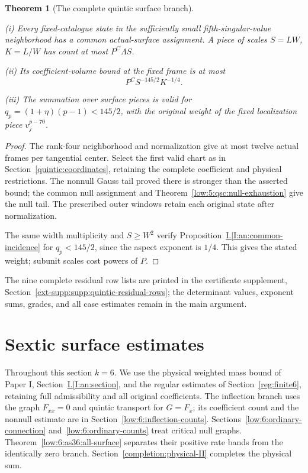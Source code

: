 \documentclass[11pt]{amsart}
\newtheorem{theorem}{Theorem}[section]
\theoremstyle{definition}
\theoremstyle{remark}
\numberwithin{equation}{section}
\newcommand{\partIref}[1]{\hyperref[I:#1]{I.\ref*{I:#1}}}
\begin{document}
\begin{theorem}[The complete quintic surface branch]\label{low:5:qsc:surface-count}

\noindent\textup{(i)} Every fixed-catalogue state in the sufficiently small fifth-singular-value neighborhood has a common actual-surface assignment. A piece of scales $S=LW$, $K=L/W$ has count at most $P^C\Lambda S$.

\noindent\textup{(ii)} Its coefficient-volume bound at the fixed frame is at most
\[
P^CS^{-145/2}K^{-1/4}.
\]

\noindent\textup{(iii)} The summation over surface pieces is valid for $q_p=(1+\eta)(p-1)<145/2$, with the original weight of the fixed localization piece $v_j^{p-70}$.
\end{theorem}
\begin{proof}
The rank-four neighborhood and normalization give at most twelve actual frames per tangential center. Select the first valid chart as in Section~\ref{quintic:coordinates}, retaining the complete coefficient and physical restrictions. The nonnull Gauss tail proved there is stronger than the asserted bound; the common null assignment and Theorem~\ref{low:5:qsc:null-exhaustion} give the null tail. The prescribed outer windows retain each original state after normalization.

The same width multiplicity and $S\ge W^2$ verify Proposition~\partIref{an:common-incidence} for $q_p<145/2$, since the aspect exponent is $1/4$. This gives the stated weight; subunit scales cost powers of $P$.
\end{proof}


The nine complete residual row lists are printed in the certificate supplement, Section~\ref{ext-supp:supp:quintic-residual-rows}; the determinant values, exponent sums, grades, and all case estimates remain in the main argument.


\section{Sextic surface estimates}\label{low:degree6}

Throughout this section $k=6$. We use the physical weighted mass bound of Paper I, Section~\partIref{an:section}, and the regular estimates of Section~\ref{reg:finite6}, retaining full admissibility and all original coefficients. The inflection branch uses the graph $F_{xx}=0$ and quintic transport for $G=F_x$; its coefficient count and the nonnull estimate are in Section~\ref{low:6:inflection-counts}. Sections~\ref{low:6:ordinary-connection} and~\ref{low:6:ordinary-counts} treat critical null graphs. Theorem~\ref{low:6:as36:all-surface} separates their positive rate bands from the identically zero branch. Section~\ref{completion:physical-II} completes the physical sum.
\end{document}
